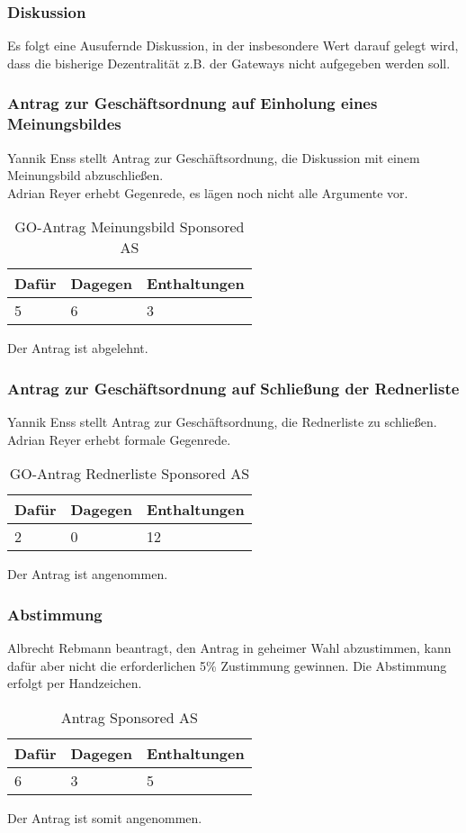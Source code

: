 \documentclass[a4paper]{scrartcl}
\begin{document}
\subsubsection{Diskussion}
Es folgt eine Ausufernde Diskussion, in der insbesondere Wert darauf gelegt wird, dass die bisherige Dezentralität z.B. der Gateways nicht aufgegeben werden soll.
\subsubsection{Antrag zur Geschäftsordnung auf Einholung eines Meinungsbildes}
Yannik Enss stellt Antrag zur Geschäftsordnung, die Diskussion mit einem Meinungsbild abzuschließen.\\
Adrian Reyer erhebt Gegenrede, es lägen noch nicht alle Argumente vor.
\begin{table}[H]
	\begin{tabularx}{\textwidth}{XXX}
		Dafür & Dagegen & Enthaltungen\\
		\toprule
		5 & 6 & 3\\
	\end{tabularx}
	\caption{GO-Antrag Meinungsbild Sponsored AS}
\end{table}
Der Antrag ist abgelehnt.

\subsubsection{Antrag zur Geschäftsordnung auf Schließung der Rednerliste}
Yannik Enss stellt Antrag zur Geschäftsordnung, die Rednerliste zu schließen.\\
Adrian Reyer erhebt formale Gegenrede.
\begin{table}[H]
	\begin{tabularx}{\textwidth}{XXX}
		Dafür & Dagegen & Enthaltungen\\
		\toprule
		2 & 0 & 12\\
	\end{tabularx}
	\caption{GO-Antrag Rednerliste Sponsored AS}
\end{table}
Der Antrag ist angenommen.

\subsubsection{Abstimmung}
Albrecht Rebmann beantragt, den Antrag in geheimer Wahl abzustimmen, kann dafür aber nicht die erforderlichen 5\% Zustimmung gewinnen. Die Abstimmung erfolgt per Handzeichen.
\begin{table}[H]
	\begin{tabularx}{\textwidth}{XXX}
		Dafür & Dagegen & Enthaltungen\\
		\toprule
		6 & 3 & 5\\
	\end{tabularx}
	\caption{Antrag Sponsored AS}
\end{table}
Der Antrag ist somit angenommen.
\end{document}
